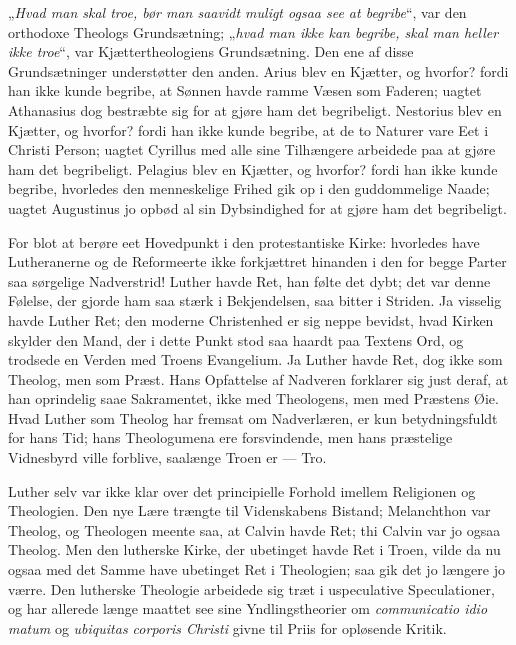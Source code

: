 \documentclass[12pt,a4paper]{book}
\newcommand{\opage}[1]{\marginnote{\footnotesize\textit{[#1]}}}
\begin{document}
„\emph{Hvad man skal troe, bør man saavidt muligt ogsaa see at begribe}“, var
den orthodoxe Theologs Grundsætning; „\emph{hvad man ikke kan begribe, skal man
heller ikke troe}“, var Kjættertheologiens Grundsætning. Den ene af disse
Grundsætninger understøtter den anden. Arius blev en Kjætter, og hvorfor? fordi
han ikke kunde begribe, at Sønnen havde ramme
\opage{117} Væsen som Faderen; uagtet Athanasius dog bestræbte sig for at gjøre ham det
begribeligt. Nestorius blev en Kjætter, og hvorfor? fordi han ikke kunde
begribe, at de to Naturer vare Eet i Christi Person; uagtet Cyrillus med alle
sine Tilhængere arbeidede paa at gjøre ham det begribeligt. Pelagius blev en
Kjætter, og hvorfor? fordi han ikke kunde begribe, hvorledes den menneskelige
Frihed gik op i den guddommelige Naade; uagtet Augustinus jo opbød al sin
Dybsindighed for at gjøre ham det begribeligt.

For blot at berøre eet Hovedpunkt i den protestantiske Kirke: hvorledes have
Lutheranerne og de Reformeerte ikke forkjættret hinanden i den for begge Parter
saa sørgelige Nadverstrid! Luther havde Ret, han følte det dybt; det var denne
Følelse, der gjorde ham saa stærk i Bekjendelsen, saa bitter i Striden. Ja
visselig havde Luther Ret; den moderne Christenhed er sig neppe bevidst, hvad
Kirken skylder den Mand, der i dette Punkt stod saa haardt paa Textens Ord, og
trodsede en Verden med Troens Evangelium. Ja Luther havde Ret, dog ikke som
Theolog, men som Præst. Hans Opfattelse af Nadveren forklarer sig just deraf,
at han oprindelig saae Sakramentet, ikke med Theologens, men med Præstens Øie.
Hvad Luther som Theolog har fremsat om Nadverlæren, er kun betydningsfuldt for
hans Tid; hans Theologumena ere forsvindende, men hans præstelige Vidnesbyrd
ville forblive, saalænge Troen er --- Tro.

Luther selv var ikke klar over det principielle Forhold imellem Religionen og
Theologien. Den nye Lære trængte til Videnskabens Bistand; Melanchthon var
Theolog, og Theologen meente saa, at Calvin havde Ret; thi Calvin var jo ogsaa
Theolog. Men den lutherske Kirke, der ubetinget havde Ret i Troen, vilde da nu
ogsaa med det Samme have ubetinget Ret i Theologien; saa gik det jo længere jo
værre. Den lutherske Theologie arbeidede sig træt i uspeculative Speculationer,
og har allerede længe maattet see sine Yndlingstheorier om \textit{communicatio
idio\-%
\opage{118}matum} og \textit{ubiquitas corporis Christi} givne til Priis for opløsende
Kritik.
\end{document}
